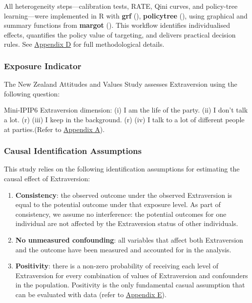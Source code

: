 \documentclass[
  single column]{article}
\begin{document}
All heterogeneity steps---calibration tests, RATE, Qini curves, and
policy-tree learning---were implemented in R with \textbf{grf}
(), \textbf{policytree}
(), using
graphical and summary functions from \textbf{margot}
(). This workflow identifies
individualised effects, quantifies the policy value of targeting, and
delivers practical decision rules. See
\hyperref[appendix-explain-grf]{Appendix D} for full methodological
details.

\subsubsection{Exposure Indicator}\label{exposure-indicator}

The New Zealand Attitudes and Values Study assesses Extraversion using
the following question:

Mini-IPIP6 Extraversion dimension: (i) I am the life of the party. (ii)
I don't talk a lot. (r) (iii) I keep in the background. (r) (iv) I talk
to a lot of different people at parties.(Refer to
\hyperref[appendix-measures]{Appendix A}).

\subsubsection{Causal Identification
Assumptions}\label{causal-identification-assumptions}

This study relies on the following identification assumptions for
estimating the causal effect of Extraversion:

\begin{enumerate}
\def\labelenumi{\arabic{enumi}.}
\item
  \textbf{Consistency}: the observed outcome under the observed
  Extraversion is equal to the potential outcome under that exposure
  level. As part of consistency, we assume no interference: the
  potential outcomes for one individual are not affected by the
  Extraversion status of other individuals.
\item
  \textbf{No unmeasured confounding}: all variables that affect both
  Extraversion and the outcome have been measured and accounted for in
  the analysis.
\item
  \textbf{Positivity}: there is a non-zero probability of receiving each
  level of Extraversion for every combination of values of Extraversion
  and confounders in the population. Positivity is the only fundamental
  casual assumption that can be evaluated with data (refer to
  \hyperref[appendix-positivity]{Appendix E}).
\end{enumerate}
\end{document}
